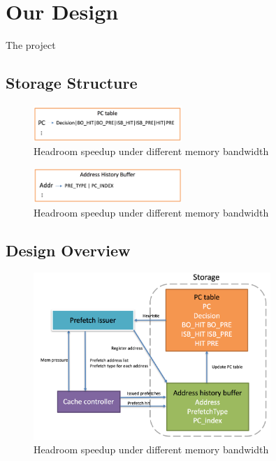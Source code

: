 \section{Our Design}
\label{sec:ourdesign}

The project

  \subsection{Storage Structure}
  \label{sec:storestruct}
  \begin{figure}[ht!]
	   \centering
	   \includegraphics[width=0.5\textwidth]{images/pc_table.png}
	   \caption{Headroom speedup under different memory bandwidth}
	   \label{fig:headroom_speedup}
  \end{figure}

  \begin{figure}[ht!]
	   \centering
	   \includegraphics[width=0.5\textwidth]{images/address_buf.png}
	   \caption{Headroom speedup under different memory bandwidth}
	   \label{fig:headroom_speedup}
  \end{figure}

  \subsection{Design Overview}
  \label{sec:dynamicdesignoverview}
  \begin{figure}[ht!]
	   \centering
	   \includegraphics[width=0.8\textwidth]{images/dynamic_design.png}
	   \caption{Headroom speedup under different memory bandwidth}
	   \label{fig:headroom_speedup}
  \end{figure}
